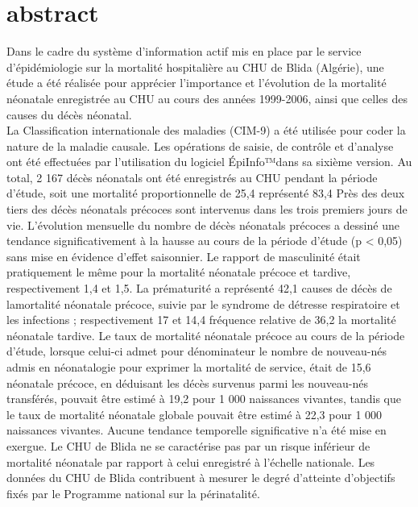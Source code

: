 

\section{abstract}

Dans le cadre du système d’information actif mis
en place par le service d’épidémiologie sur la mortalité
hospitalière au CHU de Blida (Algérie), une étude a été
réalisée pour apprécier l’importance et l’évolution de la
mortalité néonatale enregistrée au CHU au cours des années
1999-2006, ainsi que celles des causes du décès néonatal.\\
La Classification internationale des maladies (CIM-9) a
été utilisée pour coder la nature de la maladie causale. Les
opérations de saisie, de contrôle et d’analyse ont été effectuées
par l’utilisation du logiciel ÉpiInfo™dans sa sixième version.
Au total, 2 167 décès néonatals ont été enregistrés au CHU
pendant la période d’étude, soit une mortalité proportionnelle
de 25,4 %
représenté 83,4 %
Près des deux tiers des décès néonatals précoces sont
intervenus dans les trois premiers jours de vie. L’évolution
mensuelle du nombre de décès néonatals précoces a dessiné
une tendance significativement à la hausse au cours de la
période d’étude (p < 0,05) sans mise en évidence d’effet
saisonnier. Le rapport de masculinité était pratiquement le
même pour la mortalité néonatale précoce et tardive, respectivement
1,4 et 1,5. La prématurité a représenté 42,1 %
causes de décès de lamortalité néonatale précoce, suivie par le
syndrome de détresse respiratoire et les infections ; respectivement
17 et 14,4 %
fréquence relative de 36,2 %
la mortalité néonatale tardive. Le taux de mortalité néonatale
précoce au cours de la période d’étude, lorsque celui-ci admet
pour dénominateur le nombre de nouveau-nés admis en
néonatalogie pour exprimer la mortalité de service, était de
15,6 %
néonatale précoce, en déduisant les décès survenus parmi
les nouveau-nés transférés, pouvait être estimé à 19,2 pour
1 000 naissances vivantes, tandis que le taux de mortalité
néonatale globale pouvait être estimé à 22,3 pour 1 000 naissances
vivantes. Aucune tendance temporelle significative n’a
été mise en exergue. Le CHU de Blida ne se caractérise pas par
un risque inférieur de mortalité néonatale par rapport à celui
enregistré à l’échelle nationale. Les données du CHU de Blida
contribuent à mesurer le degré d’atteinte d’objectifs fixés par
le Programme national sur la périnatalité.